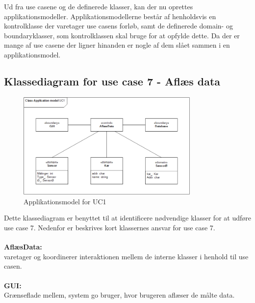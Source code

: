 Ud fra use casene og de definerede klasser, kan der nu oprettes applikationsmodeller. Applikationsmodellerne
består af henholdsvis en kontrolklasse der varetager use casens forløb, samt de definerede domain-
og boundaryklasser, som kontrolklassen skal bruge for at opfylde dette. Da der er mange af use casene der ligner hinanden er nogle af dem slået sammen i en applikationsmodel. 


\subsection{Klassediagram for use case 7 - Aflæs data}

\begin{figure}[H]
    \centering
    \includegraphics[width=0.8\textwidth]{Systemarkitektur/KlasseDiagrammer/7_AflaesData.PNG}
    \caption{Applikationsmodel for UC1}
    \label{fig:app_uc7}
\end{figure}

Dette klassediagram er benyttet til at identificere nødvendige klasser for at udføre use case 7.
Nedenfor er beskrives kort klassernes ansvar for use case 7.
\\\\
\textbf{AflæsData:}\\
varetager og koordinerer interaktionen mellem de interne klasser i henhold til use casen.
\\\\
\textbf{GUI:}\\
Grænseflade mellem, system go bruger, hvor brugeren aflæser de målte data. 
\\\\

